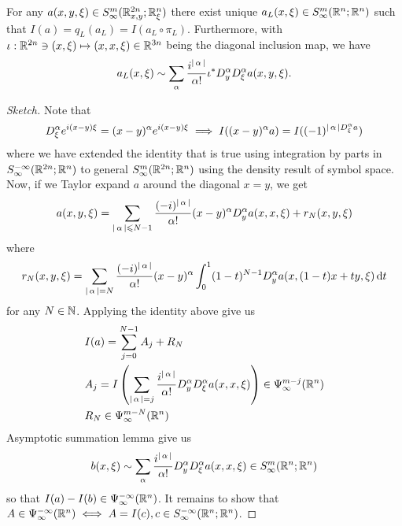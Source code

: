 \documentclass{article}
\begin{document}
\begin{flemma}[Reduction] 
    For any $a(x, y, \xi) \in S^{m}_\infty(\R^{2n}_{x, y}; \R^n_\xi)$ there exist unique $a_L(x, \xi) \in S^{m}_\infty(\R^{n}; \R^n)$ such that $I(a) = q_L(a_L) = I(a_L \circ \pi_L)$. Furthermore, with $\iota : \R^{2n} \ni (x, \xi) \mapsto (x, x, \xi) \in \R^{3n}$ being the diagonal inclusion map, we have 
    \begin{align}
    a_L(x, \xi) \sim \sum_{\alpha} \frac{i^{\abs{\alpha}}}{\alpha !} \iota^* D^\alpha_y D^\alpha_\xi a(x, y, \xi). 
    \end{align}
\end{flemma}
\begin{proof}[Sketch] 
    Note that 
    \begin{align*}
    D_\xi^\alpha e^{i(x- y) \xi} = (x - y)^\alpha e^{i(x - y) \xi} \implies I((x -y)^\alpha a) = I((-1)^{\abs{\alpha}D_\xi^\alpha a})
    \end{align*}
    where we have extended the identity that is true using integration by parts in $S^{-\infty}_\infty(\R^{2n}; \R^n)$ to general $S^{m}_\infty(\R^{2n}; \R^n)$ using the density result of symbol space. Now, if we Taylor expand $a$ around the diagonal $x =y$, we get 
    \begin{align*}
    a(x, y, \xi) = \sum_{\abs{\alpha} \leq N -1} \frac{(-i)^{\abs{\alpha}}}{\alpha !} (x - y)^\alpha D^\alpha_ya (x, x, \xi) + r_N(x, y, \xi)
    \end{align*}
    where 
    \begin{align*}
    r_N(x, y, \xi) = \sum_{\abs{\alpha} = N} \frac{(-i)^{\abs{\alpha}}}{\alpha !} (x - y)^\alpha \int_0^1 (1 - t)^{N -1} D^\alpha_ya(x, (1 -t)x + ty, \xi) \d[t]
    \end{align*}
    for any $N \in \N$.  Applying the identity above give us 
    \begin{align*}
    &I(a) = \sum_{j = 0}^{N -1} A_j + R_N \\
    &A_j = I\brac{\sum_{\abs{\alpha} = j} \frac{i^{\abs{\alpha}}}{\alpha !} D^\alpha_y D^\alpha_\xi a (x, x, \xi)} \in \Psi^{m - j}_\infty(\R^n)\\
    &R_N \in \Psi^{m -N}_\infty(\R^n)
    \end{align*}
    Asymptotic summation lemma give us 
    \begin{align*}
    b(x, \xi) \sim \sum_{\alpha} \frac{i^{\abs{\alpha}}}{\alpha !} D^\alpha_y D^\alpha_\xi a (x, x, \xi) \in S^{m}_\infty(\R^{n}; \R^n)
    \end{align*}
    so that $I(a) - I(b) \in \Psi^{-\infty}_\infty(\R^n)$. It remains to show that $A \in \Psi^{-\infty}_\infty(\R^n) \iff A = I(c), c \in S^{-\infty}_\infty(\R^{n}; \R^n)$. 
\end{proof}
\end{document}
